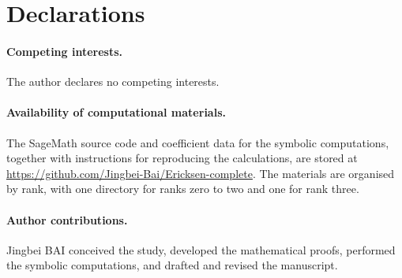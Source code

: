 \documentclass[11pt,a4paper]{article}
\numberwithin{equation}{section}
\theoremstyle{plain}
\theoremstyle{definition}
\theoremstyle{remark}
\begin{document}


\section*{Declarations}

\paragraph{Competing interests.}
The author declares no competing interests.

\paragraph{Availability of computational materials.}
The SageMath source code and coefficient data for the symbolic computations,
together with instructions for reproducing the calculations, are stored
at \url{https://github.com/Jingbei-Bai/Ericksen-complete}.
The materials are organised by rank, with one directory for ranks zero
to two and one for rank three.

\paragraph{Author contributions.}
Jingbei BAI conceived the study, developed the mathematical proofs,
performed the symbolic computations, and drafted and revised the manuscript.
\end{document}
